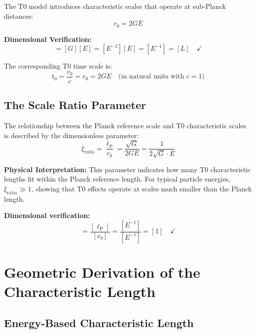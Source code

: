 \documentclass[12pt,a4paper]{report}
\newcommand{\lP}{\ell_{\text{P}}}         %
\newcommand{\rzero}{r_0}                  %
\newcommand{\tzero}{t_0}                  %
\newcommand{\xirat}{\xi_{\text{ratio}}}   %
\begin{document}
	The T0 model introduces characteristic scales that operate at sub-Planck distances:
	\begin{equation}
		\boxed{\rzero = 2GE}
		\label{eq:t0_characteristic_length}
	\end{equation}
	
	\textbf{Dimensional Verification:}
	\begin{equation}
		[\rzero] = [G][E] = [E^{-2}][E] = [E^{-1}] = [L] \quad \checkmark
	\end{equation}
	
	The corresponding T0 time scale is:
	\begin{equation}
		\tzero = \frac{\rzero}{c} = \rzero = 2GE \quad \text{(in natural units with } c = 1\text{)}
	\end{equation}
	
	\subsection{The Scale Ratio Parameter}\label{subsec:scale_ratio}
	
	The relationship between the Planck reference scale and T0 characteristic scales is described by the dimensionless parameter:
	\begin{equation}
		\boxed{\xirat = \frac{\lP}{\rzero} = \frac{\sqrt{G}}{2GE} = \frac{1}{2\sqrt{G} \cdot E}}
		\label{eq:scale_ratio}
	\end{equation}
	
	\textbf{Physical Interpretation:} This parameter indicates how many T0 characteristic lengths fit within the Planck reference length. For typical particle energies, $\xirat \gg 1$, showing that T0 effects operate at scales much smaller than the Planck length.
	
	\textbf{Dimensional verification:}
	\begin{equation}
		[\xi] = \frac{[\lP]}{[\rzero]} = \frac{[E^{-1}]}{[E^{-1}]} = [1] \quad \checkmark
	\end{equation}
	
	\section{Geometric Derivation of the Characteristic Length}\label{sec:geometric_derivation}
	
	\subsection{Energy-Based Characteristic Length}\label{subsec:energy_based_length}
	
\end{document}
